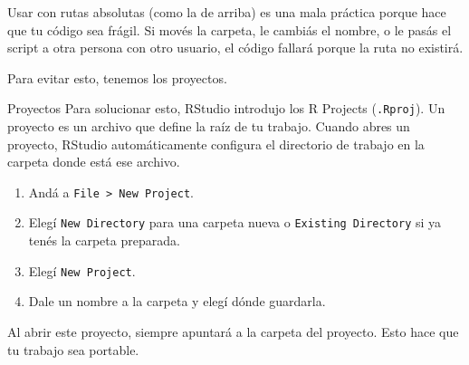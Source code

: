 \documentclass[8pt]{beamer}
\begin{document}
	
	
	\begin{frame}[fragile]
		Usar  con rutas absolutas (como la de arriba) es una mala práctica porque hace que tu código sea frágil. Si mov\'es la carpeta, le cambi\'as el nombre, o le pas\'as el script a otra persona con otro usuario, el código fallará porque la ruta  no existirá.
		
		Para evitar esto, tenemos los proyectos.
	\end{frame}
	
	
	
	\begin{frame}[fragile]{Proyectos}
		Para solucionar esto, RStudio introdujo los R Projects (\verb`.Rproj`). Un proyecto es un archivo que define la raíz de tu trabajo. Cuando abres un proyecto, RStudio automáticamente configura el directorio de trabajo en la carpeta donde está ese archivo.
		
		\begin{enumerate}
			\item And\'a a \verb`File > New Project`.
			\item Eleg\'i \verb`New Directory` para una carpeta nueva o \verb`Existing Directory` si ya ten\'es la carpeta preparada.
			\item Eleg\'i \verb`New Project`.
			\item Dale un nombre a la carpeta y eleg\'i dónde guardarla.
		\end{enumerate}
		
		
		Al abrir este proyecto,  siempre apuntará a la carpeta del proyecto. Esto hace que tu trabajo sea portable.
	\end{frame}
	
	
	
\end{document}
